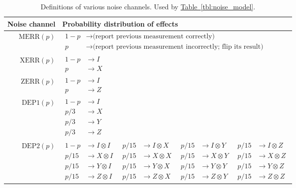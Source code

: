 \documentclass[onecolumn,unpublished,a4paper]{quantumarticle}
\theoremstyle{definition}
\theoremstyle{definition}
\theoremstyle{definition}
\newcommand{\tbl}[1]{\hyperref[tbl:#1]{Table~\ref*{tbl:#1}}}
\begin{document}
\begin{table}[h]
    \centering
    \begin{tabular}{|r|l|}
    \hline
    Noise channel & Probability distribution of effects
    \\
    \hline
    $\text{MERR}(p)$ & $\begin{aligned}
        1-p &\rightarrow \text{(report previous measurement correctly)}
        \\
        p &\rightarrow \text{(report previous measurement incorrectly; flip its result)}
    \end{aligned}$
    \\
    \hline
    $\text{XERR}(p)$ & $\begin{aligned}
        1-p &\rightarrow I
        \\
        p &\rightarrow X
    \end{aligned}$
    \\
    \hline
    $\text{ZERR}(p)$ & $\begin{aligned}
        1-p &\rightarrow I
        \\
        p &\rightarrow Z
    \end{aligned}$
    \\
    \hline
    $\text{DEP1}(p)$ & $\begin{aligned}
        1-p &\rightarrow I
        \\
        p/3 &\rightarrow X
        \\
        p/3 &\rightarrow Y
        \\
        p/3 &\rightarrow Z
    \end{aligned}$
    \\
    \hline
    $\text{DEP2}(p)$ & $\begin{aligned}
        1-p &\rightarrow I \otimes I
        &\;\;
        p/15 &\rightarrow I \otimes X
        &\;\;
        p/15 &\rightarrow I \otimes Y
        &\;\;
        p/15 &\rightarrow I \otimes Z
        \\
        p/15 &\rightarrow X \otimes I
        &\;\;
        p/15 &\rightarrow X \otimes X
        &\;\;
        p/15 &\rightarrow X \otimes Y
        &\;\;
        p/15 &\rightarrow X \otimes Z
        \\
        p/15 &\rightarrow Y \otimes I
        &\;\;
        p/15 &\rightarrow Y \otimes X
        &\;\;
        p/15 &\rightarrow Y \otimes Y
        &\;\;
        p/15 &\rightarrow Y \otimes Z
        \\
        p/15 &\rightarrow Z \otimes I
        &\;\;
        p/15 &\rightarrow Z \otimes X
        &\;\;
        p/15 &\rightarrow Z \otimes Y
        &\;\;
        p/15 &\rightarrow Z \otimes Z
    \end{aligned}$
    \\
    \hline
    \end{tabular}
    \caption{
        Definitions of various noise channels.
        Used by \tbl{noise_model}.
    }
    \label{tbl:noise_channels}
\end{table}
\end{document}
